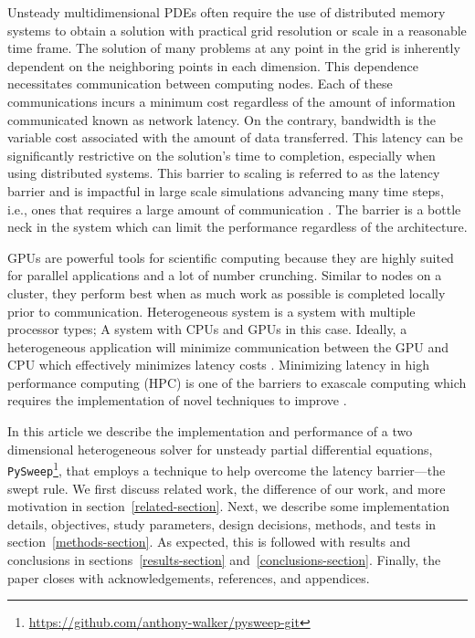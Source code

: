 \documentclass[review]{elsarticle}
\def\github{https://github.com/walkanth/pysweep}
\def\github{\url{https://github.com/anthony-walker/pysweep-git}}
\def\pysweep{\texttt{PySweep}}
\begin{document}
Unsteady multidimensional PDEs often require the use of distributed memory systems to obtain a solution with practical grid resolution or scale in a reasonable time frame. The solution of many problems at any point in the grid is inherently dependent on the neighboring points in each dimension. This dependence necessitates communication between computing nodes. Each of these communications incurs a minimum cost regardless of the amount of information communicated known as network latency. On the contrary, bandwidth is the variable cost associated with the amount of data transferred. This latency can be significantly restrictive on the solution's time to completion, especially when using distributed systems. This barrier to scaling is referred to as the latency barrier and is impactful in large scale simulations advancing many time steps, i.e., ones that requires a large amount of communication \cite{Alhubail2016ThePDEs}. The barrier is a bottle neck in the system which can limit the performance regardless of the architecture.

\par
GPUs are powerful tools for scientific computing because they are highly suited for parallel applications and a lot of number crunching. Similar to nodes on a cluster, they perform best when as much work as possible is completed locally prior to communication. Heterogeneous system is a system with multiple processor types; A system with CPUs and GPUs in this case.  Ideally, a heterogeneous application will minimize communication between the GPU and CPU which effectively minimizes latency costs \cite{OanceaGPGPUCOMPUTING}. Minimizing latency in high performance computing (HPC) is one of the barriers to exascale computing which requires the implementation of novel techniques to improve \cite{Alexandrov2016RouteSkills}.

\par
In this article we describe the implementation and performance of a two dimensional heterogeneous solver for unsteady partial differential equations, \pysweep{}\footnote{\github}, that employs a technique to help overcome the latency barrier---the swept rule. We first discuss related work, the difference of our work, and more motivation in section~\ref{related-section}. Next, we describe some implementation details, objectives, study parameters, design decisions, methods, and tests in section~\ref{methods-section}. As expected, this is followed with results and conclusions in sections~\ref{results-section} and~\ref{conclusions-section}. Finally, the paper closes with acknowledgements, references, and appendices.
\end{document}
